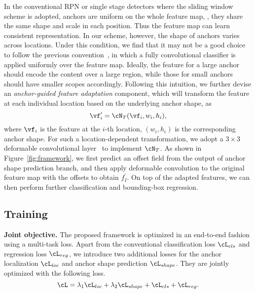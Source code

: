\documentclass[10pt,twocolumn,letterpaper]{article}
\begin{document}
In the conventional RPN or single stage detectors where the sliding window scheme
is adopted, anchors are uniform on the whole feature map, \ie, they share the
same shape and scale in each position. Thus the feature map can learn
consistent representation.
In our scheme, however, the shape of anchors varies across locations.
Under this condition, we find that it may not be a good choice to follow
the previous convention~\cite{ren2015faster}, in which a fully convolutional
classifier is applied uniformly over the feature map.
Ideally, the feature for a large anchor should encode the content over
a large region, while those for small anchors should have smaller scopes
accordingly.
Following this intuition, we further devise an
\emph{anchor-guided feature adaptation} component, which will transform
the feature at each individual location based on the underlying anchor shape,
as
\begin{equation}
	\vf_i^\prime = \cN_T(\vf_i, w_i, h_i),
\end{equation}
where $\vf_i$ is the feature at the $i$-th location, $(w_i, h_i)$ is the
corresponding anchor shape.
For such a location-dependent transformation, we adopt a
$3\times3$ deformable convolutional layer~\cite{dai16rfcn} to implement $\cN_T$.
As shown in Figure~\ref{fig:framework}, we first predict an offset
field from the output of anchor shape prediction branch, and then apply
deformable convolution to the original feature map with the offsets to
obtain $f_I^\prime$.
On top of the adapted features, we can then perform further
classification and bounding-box regression.

\subsection{Training}

\noindent
\textbf{Joint objective.}
The proposed framework is optimized in an end-to-end fashion using a multi-task loss.
Apart from the conventional classification loss $\cL_{cls}$ and regression loss $\cL_{reg}$,
we introduce two additional losses for the anchor localization $\cL_{loc}$ and
anchor shape prediction $\cL_{shape}$.
They are jointly optimized with the following loss.
\begin{equation}
	\cL = \lambda_1\cL_{loc} + \lambda_2\cL_{shape} + \cL_{cls} + \cL_{reg}.
\end{equation}
\end{document}
